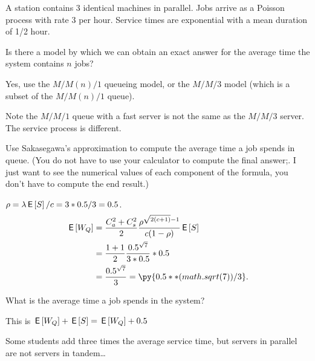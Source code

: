 A station contains 3 identical machines in parallel. Jobs arrive as a Poisson process with rate $3$ per hour. Service times are exponential with a mean duration of 1/2 hour. 

\begin{exercise}[201807]{1}
  Is there a model by which we can obtain an exact answer for the average time the system contains $n$ jobs? 
\begin{solution}
    Yes, use the $M/M(n)/1$ queueing model, or the $M/M/3$ model (which is a subset of the $M/M(n)/1$ queue). 

Note the $M/M/1$ queue with a fast server is not the same as the $M/M/3$ server. The service process is different. 
\end{solution}
\end{exercise}


\begin{exercise}[201807]{1}
Use Sakasegawa's approximation to compute the average time a job spends in queue. (You do not have to use your calculator to compute the final answer;. I just want to see the numerical values of each component of the formula, you don't have to compute the end result.)
\begin{solution}
$\rho = \lambda \,\mathsf{E}\left[S\right]/c = 3 *0.5/3=0.5$.
\begin{align*}
  \E{W_Q} 
&= \frac{C_a^2+C_s^2}2 \frac{\rho^{\sqrt{2(c+1)}-1}}{c(1-\rho)} \E S \\
&= \frac{1+1}2 \frac{0.5^{\sqrt{7}}}{3*0.5} *0.5 \\
&=\frac{0.5^{\sqrt{7}}}{3} = \py{0.5**(math.sqrt(7))/3}.
\end{align*}
\end{solution}
\end{exercise}


\begin{exercise}[201807]{1}
  What is the average time a job spends in the system?
\begin{solution}
    This is $\,\mathsf{E}\left[W_Q\right] + \,\mathsf{E}\left[S\right] = \,\mathsf{E}\left[W_Q\right] + 0.5$
\end{solution}

Some students add three times the average service time, but servers in parallel are not servers in tandem\ldots
\end{exercise}


